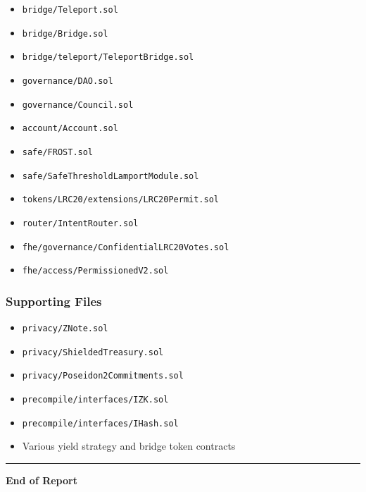 \documentclass[
]{article}
\providecommand{\tightlist}{%
  \setlength{\itemsep}{0pt}\setlength{\parskip}{0pt}}
\begin{document}
\begin{itemize}
\tightlist
\item
  \texttt{bridge/Teleport.sol}
\item
  \texttt{bridge/Bridge.sol}
\item
  \texttt{bridge/teleport/TeleportBridge.sol}
\item
  \texttt{governance/DAO.sol}
\item
  \texttt{governance/Council.sol}
\item
  \texttt{account/Account.sol}
\item
  \texttt{safe/FROST.sol}
\item
  \texttt{safe/SafeThresholdLamportModule.sol}
\item
  \texttt{tokens/LRC20/extensions/LRC20Permit.sol}
\item
  \texttt{router/IntentRouter.sol}
\item
  \texttt{fhe/governance/ConfidentialLRC20Votes.sol}
\item
  \texttt{fhe/access/PermissionedV2.sol}
\end{itemize}

\subsubsection{Supporting Files}\label{supporting-files}

\begin{itemize}
\tightlist
\item
  \texttt{privacy/ZNote.sol}
\item
  \texttt{privacy/ShieldedTreasury.sol}
\item
  \texttt{privacy/Poseidon2Commitments.sol}
\item
  \texttt{precompile/interfaces/IZK.sol}
\item
  \texttt{precompile/interfaces/IHash.sol}
\item
  Various yield strategy and bridge token contracts
\end{itemize}

\begin{center}\rule{0.5\linewidth}{0.5pt}\end{center}

\textbf{End of Report}
\end{document}
